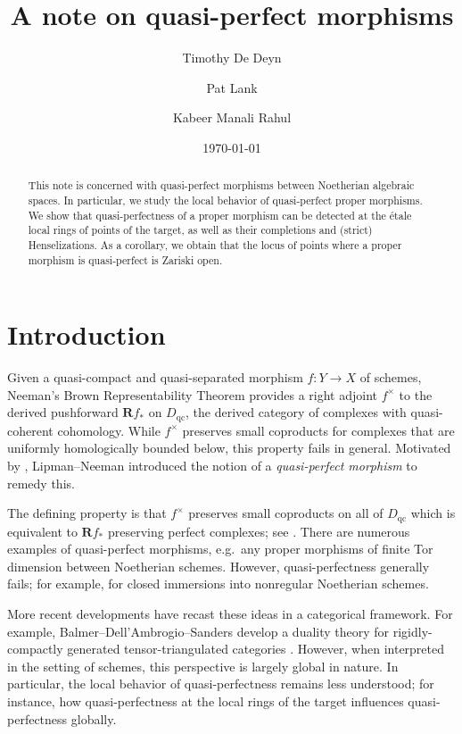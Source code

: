 \documentclass[11pt]{amsart}
\title{A note on quasi-perfect morphisms}
\author[T.~De Deyn]{Timothy De Deyn}
\author[P.~Lank]{Pat Lank}
\author[K.~Manali Rahul]{Kabeer Manali Rahul}
\date{\today}
\theoremstyle{plain}
\theoremstyle{definition}
\numberwithin{equation}{section}
\numberwithin{theorem}{section}
\begin{document}
    
\begin{abstract}
    This note is concerned with quasi-perfect morphisms between Noetherian algebraic spaces. In particular, we study the local behavior of quasi-perfect proper morphisms. We show that quasi-perfectness of a proper morphism can be detected at the \'{e}tale local rings of points of the target, as well as their completions and (strict) Henselizations. As a corollary, we obtain that the locus of points where a proper morphism is quasi-perfect is Zariski open.
\end{abstract}

\maketitle


\section{Introduction}
\label{sec:intro}

Given a quasi-compact and quasi-separated morphism $f\colon Y \to X$ of schemes, Neeman’s Brown Representability Theorem provides a right adjoint $f^\times$ to the derived pushforward $\mathbf{R}f_\ast$ on $D_{\operatorname{qc}}$, the derived category of complexes with quasi-coherent cohomology. While $f^\times$ preserves small coproducts for complexes that are uniformly homologically bounded below, this property fails in general. Motivated by \cite[Lemma 1 \& Corollary 2]{Verdier:1969}, Lipman--Neeman \cite{Lipman/Neeman:2007} introduced the notion of a \emph{quasi-perfect morphism} to remedy this.

The defining property is that $f^\times$ preserves small coproducts on all of $D_{\operatorname{qc}}$ which is equivalent to $\mathbf{R}f_\ast$ preserving perfect complexes; see \cite[Theorem 1.2 \& Proposition 2.1]{Lipman/Neeman:2007}. There are numerous examples of quasi-perfect morphisms, e.g.\ any proper morphisms of finite Tor dimension between Noetherian schemes. However, quasi-perfectness generally fails; for example, for closed immersions into nonregular Noetherian schemes.

More recent developments have recast these ideas in a categorical framework. For example, Balmer--Dell'Ambrogio--Sanders develop a duality theory for rigidly-compactly generated tensor-triangulated categories \cite[Theorem 1.7]{Balmer/Dellambrogio/Sanders:2016}. However, when interpreted in the setting of schemes, this perspective is largely global in nature. In particular, the local behavior of quasi-perfectness remains less understood; for instance, how quasi-perfectness at the local rings of the target influences quasi-perfectness globally.
\end{document}
